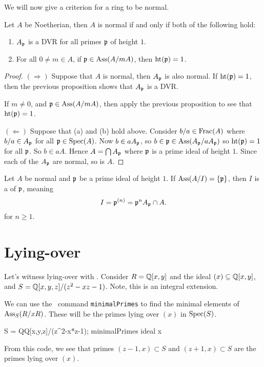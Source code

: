\documentclass{ximera}
\begin{document}
We will now give a criterion for a ring to be normal.

\begin{theorem}
  Let $A$ be Noetherian, then $A$ is normal if and only if both of the
  following hold:
  \begin{enumerate}
  \item $A_{\mathfrak{p}}$ is a DVR for all primes $\mathfrak{p}$ of height $1$.
  \item For all $0 \neq m \in A$, if $\mathfrak{p} \in \operatorname{Ass}(A/mA)$, then $\operatorname{ht}(\mathfrak{p}) = 1$.
  \end{enumerate}
  \begin{proof}
    $(\Rightarrow)$ Suppose that $A$ is normal, then $A_{\mathfrak{p}}$ is also
    normal. If $\operatorname{ht}(\mathfrak{p}) = 1$, then the previous proposition shows that
    $A_{\mathfrak{p}}$ is a DVR.

    If $m\ne 0$, and $\mathfrak{p} \in \operatorname{Ass}(A/mA)$, then apply the previous
    proposition to see that $\operatorname{ht}(\mathfrak{p}) = 1$.

    $(\Leftarrow)$ Suppose that (a) and (b) hold above. Consider
    $b/a\in\operatorname{Frac}(A)$ where $b/a\in A_{\mathfrak{p}}$ for all $\mathfrak{p}\in\operatorname{Spec}(A)$. Now
    $b\in a A_{\mathfrak{p}}$, so $b\in \mathfrak{p}\in \operatorname{Ass}(A_{\mathfrak{p}}/aA_{\mathfrak{p}})$ so $\operatorname{ht}(\mathfrak{p}) = 1$
    for all $\mathfrak{p}$.  So $b\in a A$. Hence $A = \bigcap A_{\mathfrak{p}}$ where $\mathfrak{p}$
    is a prime ideal of height $1$. Since each of the $A_{\mathfrak{p}}$ are
    normal, so is $A$.
  \end{proof}
\end{theorem}


\begin{corollary}
  Let $A$ be normal and $\mathfrak{p}$ be a prime ideal of height $1$. If
  $\operatorname{Ass}(A/I) = \{\mathfrak{p}\}$, then $I$ is a  of $\mathfrak{p}$,
  meaning
  \[
  I = \mathfrak{p}^{(n)} = \mathfrak{p}^n A_{\mathfrak{p}} \cap A.
  \]
  for  $n\ge 1$.
\end{corollary}



\section{Lying-over}

Let's witness lying-over with \macaulay.  Consider $R=\mathbb Q[x,y]$ and the
ideal $(x)\subseteq \mathbb Q[x,y]$, and $S = \mathbb Q[x,y,z]/(z^2 -xz -1)$. Note,
this is an integral extension.

We can use the \macaulay\ command \texttt{minimalPrimes} to find the
minimal elements of $\operatorname{Ass}_S(R/xR)$. These will be the primes lying
over $(x)$ in $\operatorname{Spec}(S)$.
\begin{macaulay2}
S = QQ[x,y,z]/(z^2-x*z-1);
minimalPrimes ideal x
\end{macaulay2}

From this code, we see that primes $(z-1,x)\subset S$ and
$(z+1,x)\subset S$ are the primes lying over $(x)$.






\end{document}
